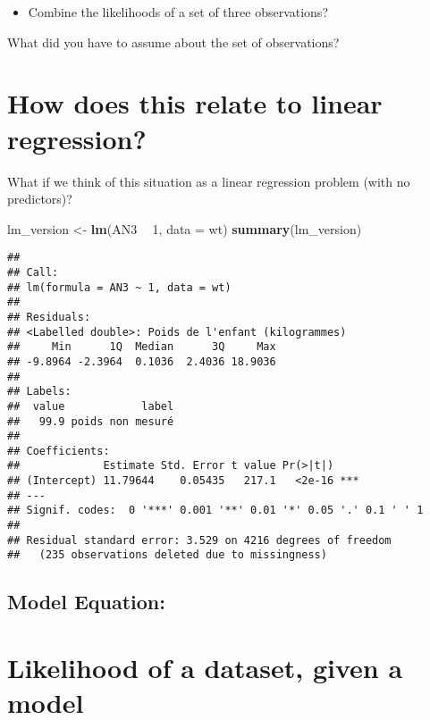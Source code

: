 \documentclass[]{book}
\newenvironment{Shaded}{\begin{snugshade}}{\end{snugshade}}
\newcommand{\DataTypeTok}[1]{\textcolor[rgb]{0.13,0.29,0.53}{#1}}
\newcommand{\DecValTok}[1]{\textcolor[rgb]{0.00,0.00,0.81}{#1}}
\newcommand{\KeywordTok}[1]{\textcolor[rgb]{0.13,0.29,0.53}{\textbf{#1}}}
\newcommand{\NormalTok}[1]{#1}
\newcommand{\OperatorTok}[1]{\textcolor[rgb]{0.81,0.36,0.00}{\textbf{#1}}}
\newcommand{\StringTok}[1]{\textcolor[rgb]{0.31,0.60,0.02}{#1}}
\providecommand{\tightlist}{%
  \setlength{\itemsep}{0pt}\setlength{\parskip}{0pt}}
\begin{document}
\begin{itemize}
\tightlist
\item
  Combine the likelihoods of a set of three observations?
\end{itemize}

What did you have to assume about the set of observations?

\hypertarget{how-does-this-relate-to-linear-regression}{%
\section{How does this relate to linear regression?}\label{how-does-this-relate-to-linear-regression}}

What if we think of this situation as a linear regression problem (with no predictors)?

\begin{Shaded}
\begin{Highlighting}[]
\NormalTok{lm_version <-}\StringTok{ }\KeywordTok{lm}\NormalTok{(AN3 }\OperatorTok{~}\StringTok{ }\DecValTok{1}\NormalTok{, }\DataTypeTok{data =}\NormalTok{ wt)}
\KeywordTok{summary}\NormalTok{(lm_version)}
\end{Highlighting}
\end{Shaded}

\begin{verbatim}
## 
## Call:
## lm(formula = AN3 ~ 1, data = wt)
## 
## Residuals:
## <Labelled double>: Poids de l'enfant (kilogrammes)
##     Min      1Q  Median      3Q     Max 
## -9.8964 -2.3964  0.1036  2.4036 18.9036 
## 
## Labels:
##  value            label
##   99.9 poids non mesuré
## 
## Coefficients:
##             Estimate Std. Error t value Pr(>|t|)    
## (Intercept) 11.79644    0.05435   217.1   <2e-16 ***
## ---
## Signif. codes:  0 '***' 0.001 '**' 0.01 '*' 0.05 '.' 0.1 ' ' 1
## 
## Residual standard error: 3.529 on 4216 degrees of freedom
##   (235 observations deleted due to missingness)
\end{verbatim}

\hypertarget{model-equation}{%
\subsection{Model Equation:}\label{model-equation}}

\hypertarget{likelihood-of-a-dataset-given-a-model}{%
\section{Likelihood of a dataset, given a model}\label{likelihood-of-a-dataset-given-a-model}}
\end{document}
